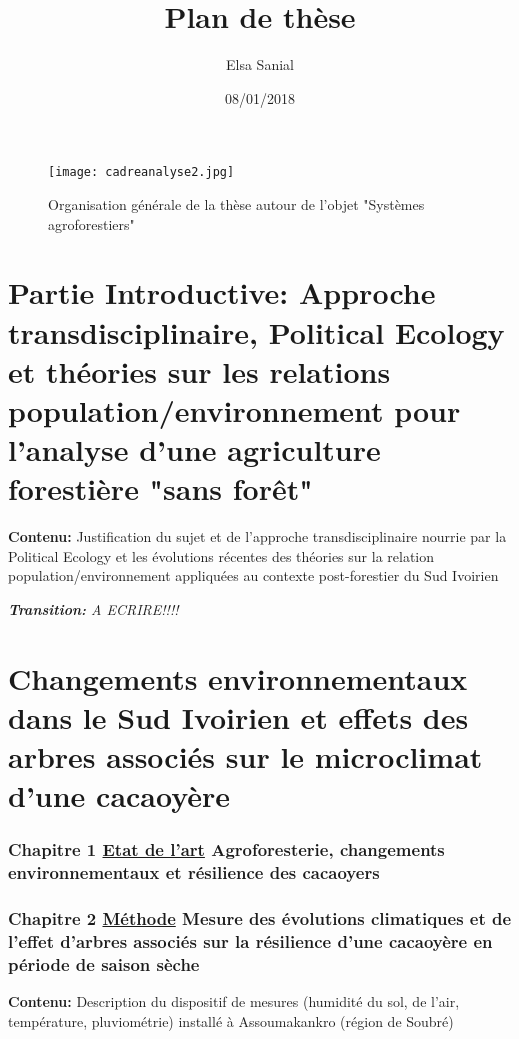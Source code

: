 \documentclass[a4paper,notitlepage]{article}
\title{Plan de thèse}
\author{Elsa Sanial}
\date{08/01/2018}
\begin{document}

\maketitle

\begin{figure}[H]
\begin{center}
\texttt{[image: cadreanalyse2.jpg]}
\caption{Organisation générale de la thèse autour de l'objet "Systèmes agroforestiers"}
\end{center}
\end{figure}


\part{Partie Introductive: Approche transdisciplinaire, Political Ecology et théories sur les relations population/environnement pour l'analyse d'une agriculture forestière "sans forêt"}
\vspace{1cm}

\textbf{Contenu:} Justification du sujet et de l'approche transdisciplinaire nourrie par la Political Ecology et les évolutions récentes des théories sur la relation population/environnement appliquées au contexte post-forestier du Sud Ivoirien

\textit{\textbf{Transition: } A ECRIRE!!!!}

\vspace{1cm}



\part{Changements environnementaux dans le Sud Ivoirien et effets des arbres associés sur le microclimat d'une cacaoyère}
\vspace{1cm}
\setcounter{section}{0}
\section*{Chapitre 1 \underline{Etat de l'art} Agroforesterie, changements environnementaux et résilience des cacaoyers}

\section*{Chapitre 2 \underline{Méthode} Mesure des évolutions climatiques et de l'effet d'arbres associés sur la résilience d'une cacaoyère en période de saison sèche}
\textbf{Contenu:} Description du dispositif de mesures (humidité du sol, de l'air, température, pluviométrie) installé à Assoumakankro (région de Soubré)
\end{document}
